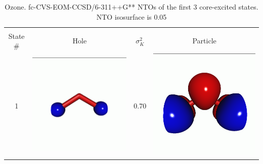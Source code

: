 \documentclass[journal=jctcce,manuscript=article]{achemso}
\begin{document}
\begin{table}[H]
\centering
\caption{Ozone. fc-CVS-EOM-CCSD/6-311++G**   NTOs of the first 3 core-excited states. NTO isosurface is 0.05\label{fgr:Ozone-ntos}}
\vspace{3em}
\begin{tabular}{ c | c c c }
    \hline
            & \multicolumn{3}{c}{} \\
    State \# &  Hole & $\sigma_K^2$ & Particle \\
    \hline
    1 &  
    \begin{minipage}{0.2\textwidth}
        \centering
        \includegraphics[scale=0.10]{NTO/O3/1h.png}
    \end{minipage}
    &
    0.70
    &  \begin{minipage}{0.2\textwidth}
        \centering
        \includegraphics[scale=0.10]{NTO/O3/1p.png}

\end{minipage}
\end{tabular}
\end{table}
\end{document}
